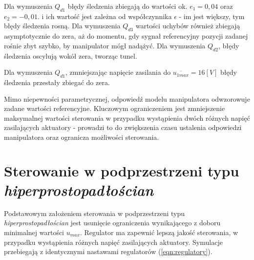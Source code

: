 \documentclass[12pt, a4paper, polish]{article}
\begin{document}
	Dla wymuszenia $Q_{d1}$ błędy śledzenia zbiegają do wartości ok. $e_1=0,04$ oraz $e_2=-0,01$. i ich wartość jest zależna od współczynnika $\epsilon$ - im jest większy, tym błędy śledzenia rosną. Dla wymuszenia $Q_{d3}$ wartości uchybów również zbiegają asymptotycznie do zera, aż do momentu, gdy sygnał referencyjny pozycji zadanej rośnie zbyt szybko, by manipulator mógł nadążyć. Dla wymuszenia $Q_{d2}$, błędy śledzenia oscylują wokół zera, tworząc tunel.
	
	Dla wymuszenia $Q_{d1}$, zmniejszając napięcie zasilania do $\overline{u_{1max}}=16[V]$ błędy śledzenia przestały zbiegać do zera.
	
	Mimo niepewności parametrycznej, odpowiedź modelu manipulatora odwzorowuje zadane wartości referencyjne. Kluczowym ograniczeniem jest zmniejszenie maksymalnej wartości sterowania w przypadku wystąpienia dwóch różnych napięć zasilających aktuatory - prowadzi to do zwiększenia czasu ustalenia odpowiedzi manipulatora oraz ogranicza możliwości sterowania.
	
	\section{Sterowanie w podprzestrzeni typu \textit{hiperprostopadłościan}}
	Podstawowym założeniem sterowania w podprzestrzeni typu \textit{hiperprostopadłościan} jest usunięcie ograniczenia wynikającego z doboru minimalnej wartości $u_{max}$. Regulator ma zapewnić lepszą jakość sterowania, w przypadku wystąpienia różnych napięć zasilających aktuatory. Symulacje przebiegają z identycznymi nastawami regulatorów (\ref{eqn:regulatory}). 
	
\end{document}
